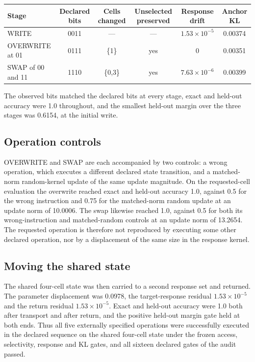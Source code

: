 \documentclass[11pt]{article}
\begin{document}
\begin{center}\small
\begin{tabular}{lccccc}
\toprule
Stage & Declared bits & Cells changed & Unselected preserved & Response drift & Anchor KL \\
\midrule
WRITE & 0011 & --- & --- & $1.53\times10^{-5}$ & 0.00374 \\
OVERWRITE at 01 & 0111 & \{1\} & yes & 0 & 0.00351 \\
SWAP of 00 and 11 & 1110 & \{0,3\} & yes & $7.63\times10^{-6}$ & 0.00399 \\
\bottomrule
\end{tabular}
\end{center}

The observed bits matched the declared bits at every stage, exact and held-out accuracy were 1.0 throughout,
and the smallest held-out margin over the three stages was 0.6154, at the initial write.

\subsection{Operation controls}

OVERWRITE and SWAP are each accompanied by two controls: a wrong operation, which executes a different declared
state transition, and a matched-norm random-kernel update of the same update magnitude. On the requested-cell evaluation the
overwrite reached exact and held-out accuracy 1.0, against 0.5 for the wrong instruction and 0.75 for the
matched-norm random update at an update norm of 10.0006. The swap likewise reached 1.0, against 0.5 for both
its wrong-instruction and matched-random controls at an update norm of 13.2654. The requested operation is
therefore not reproduced by executing some other declared operation, nor by a displacement of the same size in
the response kernel.

\subsection{Moving the shared state}

The shared four-cell state was then carried to a second response set and returned. The parameter displacement
was 0.0978, the target-response residual $1.53\times10^{-5}$ and the return residual $1.53\times10^{-5}$. Exact
and held-out accuracy were 1.0 both after transport and after return, and the positive held-out margin gate
held at both ends. Thus all five externally specified operations were successfully executed in the declared
sequence on the shared four-cell state under the frozen access, selectivity, response and KL gates, and all
sixteen declared gates of the audit passed.
\end{document}
